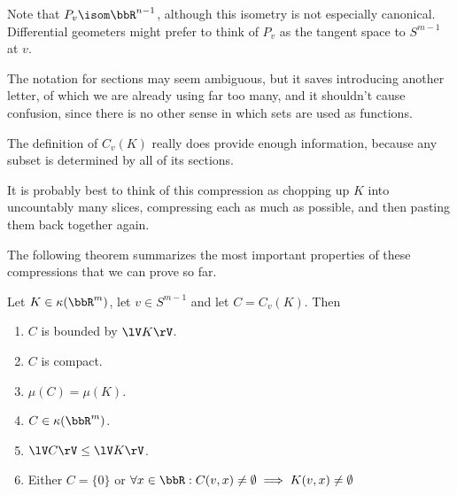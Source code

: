 \documentclass[a4paper,11pt]{article}
\begin{document}
Note that $P_v\isom\bbR^{n-1}$,
although this isometry is not especially canonical.  Differential geometers
might prefer to think of $P_v$ as the tangent space to $S^{m-1}$ at $v$.

The notation for sections may seem ambiguous, but it saves introducing another
letter, of which we are already using far too many, and it shouldn't cause
confusion, since there is no other sense in which sets are used as functions.

The definition of $C_v(K)$ really does provide enough information, because any
subset is determined by all of its sections.

It is probably best to think of this compression as chopping up $K$ into
uncountably many slices, compressing each as much as possible, and then pasting
them back together again.

The following theorem summarizes the most important properties of these
compressions that we can prove so far.

\begin{thm}
\label{thm:compressionProperties}
Let $K\in\kappa(\bbR^m)$, let $v\in S^{m-1}$ and let $C=C_v(K)$.  Then
\begin{enumerate}
\item $C$ is bounded by $\lV K\rV$.
\label{prop:compressionBounded}
\item $C$ is compact.
\label{prop:compressionCompact}
\item $\mu(C)=\mu(K)$.
\label{prop:compressionMeasurePreserving}
\item $C\in\kappa(\bbR^m)$.
\label{prop:compressionNonEmpty}
\item $\lV C\rV\leq\lV K\rV$.
\label{prop:compressionNormDecreasing}
\item Either $C=\{0\}$ or
	$\forall x\in\bbR:C(v,x)\not=\emptyset\implies K(v,x)\not=\emptyset$
\label{prop:compressionNonCreative}
\end{enumerate}
\end{thm}
\end{document}
